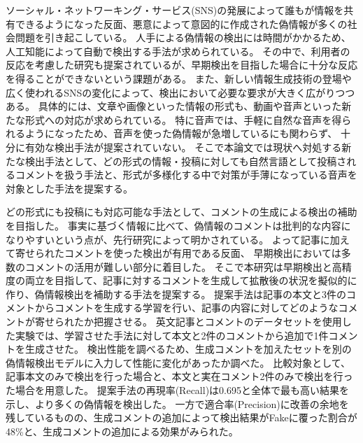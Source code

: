 ソーシャル・ネットワーキング・サービス(SNS)の発展によって誰もが情報を共有できるようになった反面、悪意によって意図的に作成された偽情報が多くの社会問題を引き起こしている。
人手による偽情報の検出には時間がかかるため、人工知能によって自動で検出する手法が求められている。
その中で、利用者の反応を考慮した研究も提案されているが、早期検出を目指した場合に十分な反応を得ることができないという課題がある。
また、新しい情報生成技術の登場や広く使われるSNSの変化によって、検出において必要な要求が大きく広がりつつある。
具体的には、文章や画像といった情報の形式も、動画や音声といった新たな形式への対応が求められている。
特に音声では、手軽に自然な音声を得られるようになったため、音声を使った偽情報が急増しているにも関わらず、
十分に有効な検出手法が提案されていない。
そこで本論文では現状へ対処する新たな検出手法として、どの形式の情報・投稿に対しても自然言語として投稿されるコメントを扱う手法と、形式が多様化する中で対策が手薄になっている音声を対象とした手法を提案する。

どの形式にも投稿にも対応可能な手法として、コメントの生成による検出の補助を目指した。
事実に基づく情報に比べて、偽情報のコメントは批判的な内容になりやすいという点が、先行研究によって明かされている。
よって記事に加えて寄せられたコメントを使った検出が有用である反面、
早期検出においては多数のコメントの活用が難しい部分に着目した。
そこで本研究は早期検出と高精度の両立を目指して、記事に対するコメントを生成して拡散後の状況を擬似的に作り、偽情報検出を補助する手法を提案する。
提案手法は記事の本文と3件のコメントからコメントを生成する学習を行い、記事の内容に対してどのようなコメントが寄せられたか把握させる。
英文記事とコメントのデータセットを使用した実験では、学習させた手法に対して本文と2件のコメントから追加で1件コメントを生成させた。
検出性能を調べるため、生成コメントを加えたセットを別の偽情報検出モデルに入力して性能に変化があったか調べた。
比較対象として、記事本文のみで検出を行った場合と、本文と実在コメント2件のみで検出を行った場合を用意した。
提案手法の再現率(Recall)は0.695と全体で最も高い結果を示し、より多くの偽情報を検出した。
一方で適合率(Precision)に改善の余地を残しているものの、生成コメントの追加によって検出結果がFakeに覆った割合が48\%と、生成コメントの追加による効果がみられた。

